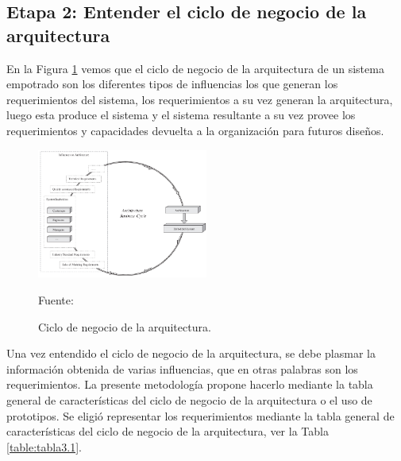 \subsection{Etapa 2: Entender el ciclo de negocio de la arquitectura}
En la Figura \ref{fig:figura3.2} vemos que el ciclo de negocio de la arquitectura de un sistema empotrado son los diferentes tipos de influencias los que generan los requerimientos del sistema, los requerimientos a su vez generan la arquitectura, luego esta produce el sistema y el sistema resultante a su vez provee los requerimientos y capacidades devuelta a la organización para futuros diseños.
\begin{figure}[H]
\begin{center}
\includegraphics[width=0.5\textwidth]{Imagenes/Cap3/image002}
\end{center}
\begin{center}
\vskip -0.5cm
\caption{\small{Ciclo de negocio de la arquitectura.}}
\label{fig:figura3.2}
{\small{Fuente: \cite{tammy}}}
\end{center}
\end{figure}

Una vez entendido el ciclo de negocio de la arquitectura, se debe plasmar la información obtenida de varias influencias, que en otras palabras son los requerimientos. La presente metodología propone hacerlo mediante la tabla general de características del ciclo de negocio de la arquitectura o el uso de prototipos. Se eligió representar los requerimientos mediante la tabla general de características del ciclo de negocio de la arquitectura, ver la Tabla \ref{table:tabla3.1}.

